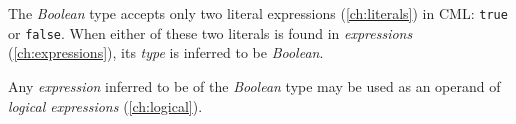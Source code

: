 The \emph{Boolean} type accepts only two literal expressions (\ref{ch:literals})
in CML: \verb|true| or \verb|false|.
When either of these two literals is found in \emph{expressions} (\ref{ch:expressions}),
its \emph{type} is inferred to be \emph{Boolean}.

Any \emph{expression} inferred to be of the \emph{Boolean} type
may be used as an operand of \emph{logical expressions} (\ref{ch:logical}).
